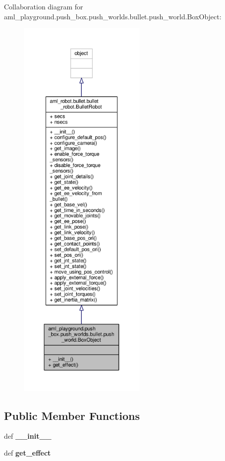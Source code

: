 Collaboration diagram for aml\-\_\-playground.\-push\-\_\-box.\-push\-\_\-worlds.\-bullet.\-push\-\_\-world.\-Box\-Object\-:
\nopagebreak
\begin{figure}[H]
\begin{center}
\leavevmode
\includegraphics[height=550pt]{classaml__playground_1_1push__box_1_1push__worlds_1_1bullet_1_1push__world_1_1_box_object__coll__graph}
\end{center}
\end{figure}
\subsection*{Public Member Functions}
\begin{DoxyCompactItemize}
\item 
\hypertarget{classaml__playground_1_1push__box_1_1push__worlds_1_1bullet_1_1push__world_1_1_box_object_a40e3b09707ed36e2d97f5a28da68b39c}{def {\bfseries \-\_\-\-\_\-init\-\_\-\-\_\-}}\label{classaml__playground_1_1push__box_1_1push__worlds_1_1bullet_1_1push__world_1_1_box_object_a40e3b09707ed36e2d97f5a28da68b39c}

\item 
\hypertarget{classaml__playground_1_1push__box_1_1push__worlds_1_1bullet_1_1push__world_1_1_box_object_a9f10a558dc0bdcc193b2f1c9ae8e6808}{def {\bfseries get\-\_\-effect}}\label{classaml__playground_1_1push__box_1_1push__worlds_1_1bullet_1_1push__world_1_1_box_object_a9f10a558dc0bdcc193b2f1c9ae8e6808}

\end{DoxyCompactItemize}
